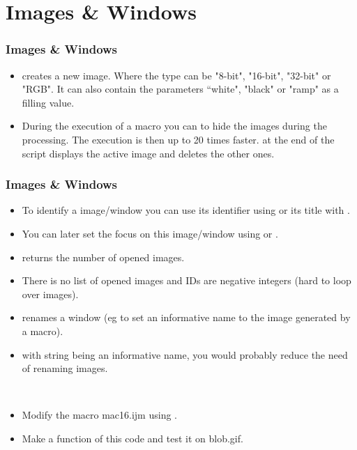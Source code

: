 \section{Images \& Windows}
\begin{frame}
  \frametitle{Images \& Windows}
  \begin{itemize}
  \item {} creates a new
    image. Where the type can be "8-bit", "16-bit", "32-bit" or
    "RGB". It can also contain the parameters “white", "black" or
    "ramp" as a filling value.
  \item During the execution of a macro you can  to
    hide the images during the processing. The execution is then up to
    20 times faster.  at the end of the script
    displays the active image and deletes the other ones.
  \end{itemize}
\end{frame}

\begin{frame}
  \frametitle{Images \& Windows}
  \begin{itemize}
  \item To identify a image/window you can use its identifier using
     or its title with .
  \item You can later set the focus on this image/window using
     or .
  \item {} returns the number of opened images.
  \item There is no list of opened images and IDs are negative
    integers (hard to loop over images).
  \item {} renames a window (eg to set an informative name
    to the image generated by a macro).
  \item {} with string being an informative
    name, you would probably reduce the need of renaming images.
  \end{itemize}
\end{frame}

\begin{frame}[fragile]
  \begin{example}~\par
    \begin{itemize}
    \item Modify the macro mac16.ijm using .
    \item Make a function of this code and test it on blob.gif.
    \end{itemize}
    
  \end{example}
\end{frame}

